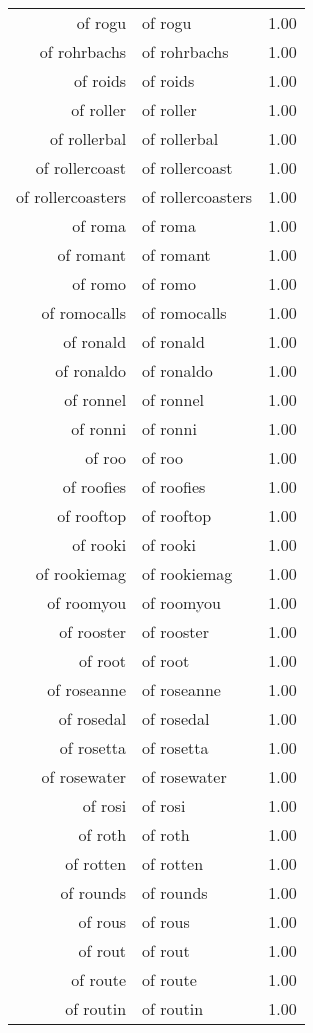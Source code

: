 \begin{table}[ht]
\begin{tabular}{rlr}
  of rogu & of rogu & 1.00 \\ 
  of rohrbachs & of rohrbachs & 1.00 \\ 
  of roids & of roids & 1.00 \\ 
  of roller & of roller & 1.00 \\ 
  of rollerbal & of rollerbal & 1.00 \\ 
  of rollercoast & of rollercoast & 1.00 \\ 
  of rollercoasters & of rollercoasters & 1.00 \\ 
  of roma & of roma & 1.00 \\ 
  of romant & of romant & 1.00 \\ 
  of romo & of romo & 1.00 \\ 
  of romocalls & of romocalls & 1.00 \\ 
  of ronald & of ronald & 1.00 \\ 
  of ronaldo & of ronaldo & 1.00 \\ 
  of ronnel & of ronnel & 1.00 \\ 
  of ronni & of ronni & 1.00 \\ 
  of roo & of roo & 1.00 \\ 
  of roofies & of roofies & 1.00 \\ 
  of rooftop & of rooftop & 1.00 \\ 
  of rooki & of rooki & 1.00 \\ 
  of rookiemag & of rookiemag & 1.00 \\ 
  of roomyou & of roomyou & 1.00 \\ 
  of rooster & of rooster & 1.00 \\ 
  of root & of root & 1.00 \\ 
  of roseanne & of roseanne & 1.00 \\ 
  of rosedal & of rosedal & 1.00 \\ 
  of rosetta & of rosetta & 1.00 \\ 
  of rosewater & of rosewater & 1.00 \\ 
  of rosi & of rosi & 1.00 \\ 
  of roth & of roth & 1.00 \\ 
  of rotten & of rotten & 1.00 \\ 
  of rounds & of rounds & 1.00 \\ 
  of rous & of rous & 1.00 \\ 
  of rout & of rout & 1.00 \\ 
  of route & of route & 1.00 \\ 
  of routin & of routin & 1.00 \\ 

\end{tabular}
\end{table}
